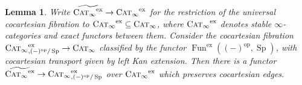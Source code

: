 \documentclass{article}
\DeclareMathOperator{\Cat}{Cat} %
\DeclareMathOperator{\CAT}{C\normalfont\textsc{at}_\infty} %
\DeclareMathOperator{\Catex}{\Cat_\infty^{ex}} %
\DeclareMathOperator{\Fun}{Fun} %
\DeclareMathOperator{\Spectra}{Sp} %
\newcommand{\op}{\mathrm{op}}
\newtheorem{lemma}[equation]{Lemma}
\theoremstyle{definition}
\newcommand{\Lucy}[1]{\todo[color=cyan!30]{\footnotesize L: #1}}
\begin{document}
\begin{lemma}\label{lemma:stable_cat_functorial_Yoneda}
    Write $ \widetilde{\CAT^{\mathrm{ex}}} \to \CAT^{\mathrm{ex}} $ for the restriction of the universal cocartesian fibration to $ \CAT^{\mathrm{ex}} \subseteq \CAT $, where $ \CAT^{\mathrm{ex}} $ denotes stable $ \infty $-categories and exact functors between them. 
    Consider the cocartesian fibration $ \CAT^{\mathrm{ex}}_{,(-)^\op/\Spectra} \to \CAT $ classified by the functor $ \Fun^{\mathrm{ex}}\left((-)^\op, \Spectra\right) $, with cocartesian transport given by left Kan extension. 
    Then there is a functor $ \widetilde{\CAT^{\mathrm{ex}}} \to \CAT^{\mathrm{ex}}_{,(-)^\op/\Spectra} $ over $ \CAT^{\mathrm{ex}} $ which preserves cocartesian edges. 
\end{lemma}
\end{document}
